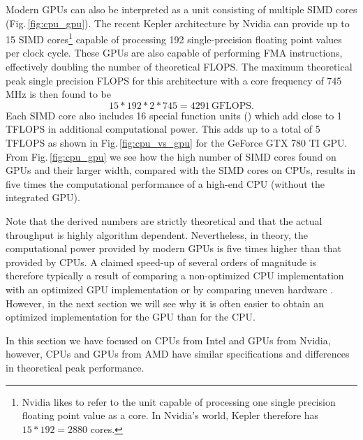 Modern GPUs can also be interpreted as a unit consisting of multiple SIMD cores (Fig.\,\ref{fig:cpu_gpu}). The recent Kepler architecture by Nvidia can provide up to 15 SIMD cores\footnote{Nvidia likes to refer to the unit capable of processing one single precision floating point value as a core. In Nvidia's world, Kepler therefore has $15*192=2880$ cores.} capable of processing 192 single-precision floating point values per clock cycle. These GPUs are also capable of performing FMA instructions, effectively doubling the number of theoretical FLOPS. The maximum theoretical peak single precision FLOPS for this architecture with a core frequency of 745 MHz is then found to be
\begin{equation}
15*192*2*745 = 4291\,\text{GFLOPS}.
\end{equation} 
Each SIMD core also includes 16 special function units () which add close to 1 TFLOPS in additional computational power. This adds up to a total of 5 TFLOPS as shown in Fig.\,\ref{fig:cpu_vs_gpu} for the GeForce GTX 780 TI GPU. From Fig.\,\ref{fig:cpu_gpu} we see how the high number of SIMD cores found on GPUs and their larger width, compared with the SIMD cores on CPUs, results in five times the computational performance of a high-end CPU (without the integrated GPU). 

Note that the derived numbers are strictly theoretical and that the actual throughput is highly algorithm dependent. Nevertheless, in theory, the computational power provided by modern GPUs is five times higher than that provided by CPUs. A claimed speed-up of several orders of magnitude is therefore typically a result of comparing a non-optimized CPU implementation with an optimized GPU implementation or by comparing uneven hardware \cite{Lee2010, Kothapalli2013}. However, in the next section we will see why it is often easier to obtain an optimized implementation for the GPU than for the CPU.

In this section we have focused on CPUs from Intel and GPUs from Nvidia, however, CPUs and GPUs from AMD have similar specifications and differences in theoretical peak performance. 

